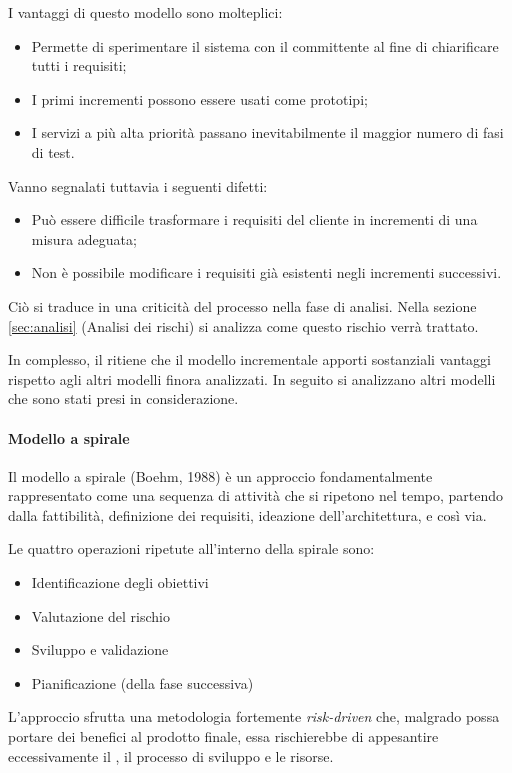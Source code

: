 I vantaggi di questo modello sono molteplici:
\begin{itemize}
\item Permette di sperimentare il sistema con il committente al fine di chiarificare tutti i requisiti;
\item I primi incrementi possono essere usati come prototipi;
\item I servizi a più alta priorità passano inevitabilmente il maggior numero di fasi di test.
\end{itemize}

Vanno segnalati tuttavia i seguenti difetti:
\begin{itemize}
\item Può essere difficile trasformare i requisiti del cliente in incrementi di una misura adeguata;
\item Non è possibile modificare i requisiti già esistenti negli incrementi successivi.
\end{itemize}

Ciò si traduce in una criticità del processo nella fase di analisi. Nella sezione {\ref{sec:analisi}} (Analisi dei rischi) si analizza come questo rischio verrà trattato.

In complesso, il  ritiene che il modello incrementale apporti sostanziali vantaggi rispetto agli altri modelli finora analizzati. In seguito si analizzano altri modelli che sono stati presi in considerazione.

			\paragraph{Modello a spirale}
			Il modello a spirale (Boehm, 1988) è un approccio fondamentalmente rappresentato come una sequenza di attività che si ripetono nel tempo, partendo dalla fattibilità, definizione dei requisiti, ideazione dell'architettura, e così via.
			
			Le quattro operazioni ripetute all'interno della spirale sono:
\begin{itemize}
\item Identificazione degli obiettivi
\item Valutazione del rischio
\item Sviluppo e validazione
\item Pianificazione (della fase successiva)
\end{itemize}			 

L'approccio sfrutta una metodologia fortemente \emph{risk-driven} che, malgrado possa portare dei benefici al prodotto finale, essa rischierebbe di appesantire eccessivamente il , il processo di sviluppo e le risorse.


